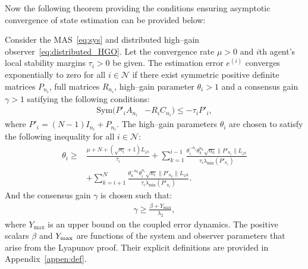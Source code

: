 \documentclass{ifacconf}
\begin{document}
Now the following theorem providing the conditions ensuring asymptotic convergence of state estimation can be provided below:
\begin{theorem}\label{thm:main result}
    Consider the MAS~\eqref{eq:sys} and distributed high--gain observer~\eqref{eq:distributed_HGO}. 
    Let the convergence rate $\mu>0$ and $i$th agent's local stability margins $\tau_i>0$ be given. The estimation error $e^{(i)}$ converges exponentially to zero for all $i\in\mathcal{N}$ if there exist symmetric positive definite matrices $P_{n_i}$, full matrices $R_{n_i}$, high--gain parameter $\theta_i>1$ and a consensus gain $\gamma>1$ satifying the following conditions:
    \begin{equation}
        \begin{aligned}
            \mathrm{Sym} \Big( P'_iA_{n_i}  &-R_iC_{n_i}\Big)\le -\tau_iP'_i,
        \end{aligned}\label{eq:condition_DSTDHGO_LMIs}
    \end{equation}
    where $P'_i=(N-1)I_{n_i}+P_{n_i}$.
    The high--gain parameters $\theta_i$ are chosen to satisfy the following inequality for all $i \in \mathcal{N}$:
        \begin{align}
                 \theta_i \ge& \frac{\mu+N+(\sqrt{n_i}+1)L_{\varphi i}}{\tau_i} 
            + \sum_{k=1}^{i-1}\frac{\theta_i^{-n_i}\theta_k^{n_k}\sqrt{n_k}\|P'_{n_i}\|L_{\varphi i}}{\tau_i\lambda_{\min}(P'_{n_i})} \nonumber\\
            & + \sum_{k=i+1}^{N}\frac{ \theta_k^{-n_k}\theta_i^{n_i}\sqrt{n_i}\|P'_{n_k}\|L_{\varphi k}}{\tau_i\lambda_{\min}(P'_{n_i})}.
            \label{eq:condition_theta}
        \end{align}
    And the consensus gain $\gamma$ is chosen such that:
        \begin{equation}
            \begin{aligned}
               \gamma \ge \frac{\beta + Y_{\max}}{\lambda_{2}},
            \end{aligned}\label{eq:condition_gamma}
        \end{equation}
where $Y_{\max}$ is an upper bound on the coupled error dynamics. The positive scalars $\beta$ and $Y_{\rm max}$ are functions of the system and observer parameters that arise from the Lyapunov proof. Their explicit definitions are provided in Appendix~\ref{appen:def}.
\end{theorem}
\end{document}
